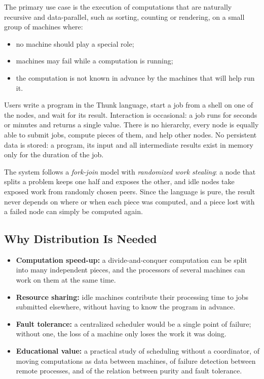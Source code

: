 \documentclass{scrartcl}
\begin{document}
The primary use case is the execution of computations that are naturally recursive and data-parallel, such as sorting, counting or rendering, on a small group of machines where:
%
\begin{itemize}
  \item no machine should play a special role;
  \item machines may fail while a computation is running;
  \item the computation is not known in advance by the machines that will help run it.
\end{itemize}

Users write a program in the Thunk language, start a job from a shell on one of the nodes, and wait for its result.
%
Interaction is occasional: a job runs for seconds or minutes and returns a single value.
%
There is no hierarchy, every node is equally able to submit jobs, compute pieces of them, and help other nodes.
%
No persistent data is stored: a program, its input and all intermediate results exist in memory only for the duration of the job.

The system follows a \emph{fork-join} model with \emph{randomized work stealing}: a node that splits a problem keeps one half and exposes the other, and idle nodes take exposed work from randomly chosen peers.
%
Since the language is pure, the result never depends on where or when each piece was computed, and a piece lost with a failed node can simply be computed again.

\subsection{Why Distribution Is Needed}

\begin{itemize}
  \item \textbf{Computation speed-up:} a divide-and-conquer computation can be split into many independent pieces, and the processors of several machines can work on them at the same time.

  \item \textbf{Resource sharing:} idle machines contribute their processing time to jobs submitted elsewhere, without having to know the program in advance.

  \item \textbf{Fault tolerance:} a centralized scheduler would be a single point of failure; without one, the loss of a machine only loses the work it was doing.

  \item \textbf{Educational value:} a practical study of scheduling without a coordinator, of moving computations as data between machines, of failure detection between remote processes, and of the relation between purity and fault tolerance.
\end{itemize}
\end{document}
